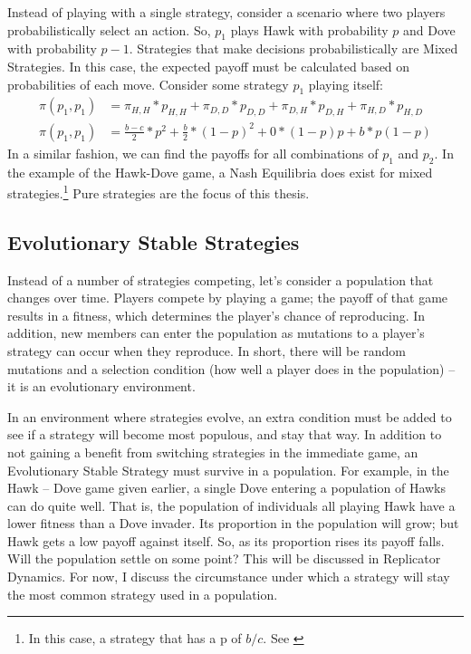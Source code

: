 \documentclass[a4paper,11pt,bcshonoursthesis,singlespace,oneside,thesisdraft,pdflatex]{cssethesis}
\renewcommand{\cite}{\citep} %
\begin{document}
Instead of playing with a single strategy, consider a scenario where two players probabilistically select an action. So, $p_1$ plays Hawk with probability $p$ and Dove with probability $p-1$. Strategies that make decisions probabilistically are Mixed Strategies. 
In this case, the expected payoff must be calculated based on probabilities of each move. 
Consider some strategy $p_1$ playing itself: 
\begin{align}
\label{eqn:probabilities}
\pi(p_1,p_1)&=\pi_{H,H}*p_{H,H}+\pi_{D,D}*p_{D,D}+\pi_{D,H}*p_{D,H}+\pi_{H,D}*p_{H,D}\\
\pi(p_1,p_1)&=\frac{b-c}{2}*p^2+\frac{b}{2}*(1-p)^2+0*(1-p)p+b*p(1-p) \nonumber
\end{align}
In a similar fashion, we can find the payoffs for all combinations of $p_1$ and $p_2$. 
In the example of the Hawk-Dove game, a Nash Equilibria does exist for mixed strategies.\footnote{In this case, a strategy that has a p of $b/c$. See \cite{nowak2006evolutionary63}} Pure strategies are the focus of this thesis.

\subsection{Evolutionary Stable Strategies}
Instead of a number of strategies competing, let's consider a population that changes over time. 
Players compete by playing a game; 
the payoff of that game results in a fitness, which determines the player's chance of reproducing. 
In addition, new members can enter the population as mutations to a player's strategy can occur when they reproduce. 
In short, there will be random mutations and a selection condition (how well a player does in the population) -- it is an evolutionary environment. 

In an environment where strategies evolve, an extra condition must be added to see if a strategy will become most populous, and stay that way. 
In addition to not gaining a benefit from switching strategies in the immediate game, an Evolutionary Stable Strategy must survive in a population. 
For example, in the Hawk -- Dove game given earlier, a single Dove entering a population of Hawks can do quite well. 
That is, the population of individuals all playing Hawk have a lower fitness than a Dove invader. 
Its proportion in the population will grow; but Hawk gets a low payoff against itself. 
So, as its proportion rises its payoff falls. 
Will the population settle on some point? This will be discussed in Replicator Dynamics. 
For now, I discuss the circumstance under which a strategy will stay the most common strategy used in a population. 
\end{document}
